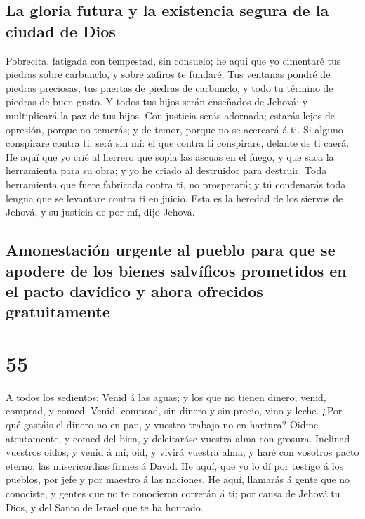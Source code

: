 \hypertarget{la-gloria-futura-y-la-existencia-segura-de-la-ciudad-de-dios}{%
\subsection{La gloria futura y la existencia segura de la ciudad de
Dios}\label{la-gloria-futura-y-la-existencia-segura-de-la-ciudad-de-dios}}

 Pobrecita, fatigada con tempestad, sin consuelo; he aquí
que yo cimentaré tus piedras sobre carbunclo, y sobre zafiros te
fundaré.  Tus ventanas pondré de piedras preciosas, tus
puertas de piedras de carbunclo, y todo tu término de piedras de buen
gusto.  Y todos tus hijos serán enseñados de Jehová; y
multiplicará la paz de tus hijos.  Con justicia serás
adornada; estarás lejos de opresión, porque no temerás; y de temor,
porque no se acercará á ti.  Si alguno conspirare contra
ti, será sin mí: el que contra ti conspirare, delante de ti caerá.
 He aquí que yo crié al herrero que sopla las ascuas en
el fuego, y que saca la herramienta para su obra; y yo he criado al
destruidor para destruir.  Toda herramienta que fuere
fabricada contra ti, no prosperará; y tú condenarás toda lengua que se
levantare contra ti en juicio. Esta es la heredad de los siervos de
Jehová, y su justicia de por mí, dijo Jehová.

\hypertarget{amonestaciuxf3n-urgente-al-pueblo-para-que-se-apodere-de-los-bienes-salvuxedficos-prometidos-en-el-pacto-davuxeddico-y-ahora-ofrecidos-gratuitamente}{%
\subsection{Amonestación urgente al pueblo para que se apodere de los
bienes salvíficos prometidos en el pacto davídico y ahora ofrecidos
gratuitamente}\label{amonestaciuxf3n-urgente-al-pueblo-para-que-se-apodere-de-los-bienes-salvuxedficos-prometidos-en-el-pacto-davuxeddico-y-ahora-ofrecidos-gratuitamente}}

\hypertarget{section-54}{%
\section{55}\label{section-54}}

 A todos los sedientos: Venid á las aguas; y los que no
tienen dinero, venid, comprad, y comed. Venid, comprad, sin dinero y sin
precio, vino y leche.  ¿Por qué gastáis el dinero no en
pan, y vuestro trabajo no en hartura? Oidme atentamente, y comed del
bien, y deleitaráse vuestra alma con grosura.  Inclinad
vuestros oídos, y venid á mí; oid, y vivirá vuestra alma; y haré con
vosotros pacto eterno, las misericordias firmes á David. 
He aquí, que yo lo dí por testigo á los pueblos, por jefe y por maestro
á las naciones.  He aquí, llamarás á gente que no
conociste, y gentes que no te conocieron correrán á ti; por causa de
Jehová tu Dios, y del Santo de Israel que te ha honrado.

